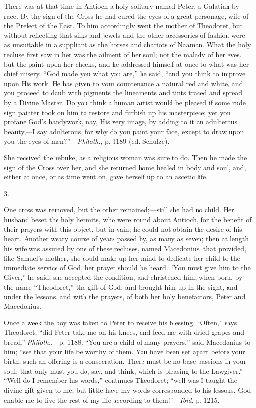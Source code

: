 There was at that time in Antioch a holy solitary named Peter, a
Galatian by race. By the sign of the Cross he had cured the eyes of a
great personage, wife of the Prefect of the East. To him accordingly
went the mother of Theodoret, but without reflecting that silks and
jewels and the other accessories of fashion were as unsuitable in a
suppliant as the horses and chariots of Naaman. What the holy recluse
first saw in her was the ailment of her soul; not the malady of her
eyes, but the paint upon her cheeks, and he addressed himself at once
to what was her chief misery. ``God made you what you are,''
he said, ``and you think to improve upon His work. He has
given to your countenance a natural red and white, and you proceed to
daub with pigments the lineaments and tints traced and spread by a
Divine Master. Do you think a human artist would be pleased if some
rude sign painter took on him to restore and furbish up his
masterpiece; yet you profane God's handywork, nay, His very image, by
adding to it an adulterous beauty,—I say adulterous, for why do you
paint your face, except to draw upon you the eyes of men?''—\emph{Philoth}.,
p. 1189 (ed. Schulze).

She received the rebuke, as a religious woman was sure to do. Then
he made the sign of the Cross over her, and she returned home healed
in body and soul, and, either at once, or as time went on, gave
herself up to an ascetic life.

3.

One cross was removed, but the other remained;—still she had no
child. Her husband beset the holy hermits, who were round about
Antioch, for the benefit of their prayers with this object, but in
vain; he could not obtain the desire of his heart. Another weary
course of years passed by, as many as seven; then at length his wife
was assured by one of these recluses, named Macedonius, that provided,
like Samuel's mother, she could make up her mind to dedicate her child
to the immediate service of God, her prayer should be heard. ``You
must give him to the Giver,'' he said; she accepted the condition,
and christened him, when born, by the name ``Theodoret,'' the
gift of God: and brought him up in the sight, and under the lessons,
and with the prayers, of both her holy benefactors, Peter and
Macedonius.

Once a week the boy was taken to Peter to receive his
blessing. ``Often,'' says Theodoret, ``did Peter take me
on his knees, and feed me with dried grapes and bread.'' \emph{Philoth}.,—p.
1188. ``You are a child of many prayers,'' said Macedonius to
him; ``see that your life be worthy of them. You have been set
apart before your birth; such an offering is a consecration. There
must be no base passions in your soul; that only must you do, say, and
think, which is pleasing to the Lawgiver.'' ``Well do I
remember his words,'' continues Theodoret; ``well was I taught
the divine gift given to me; but little have my words corresponded to
his lessons. God enable me to live the rest of my life according to
them!''—\emph{Ibid}. p. 1215.

